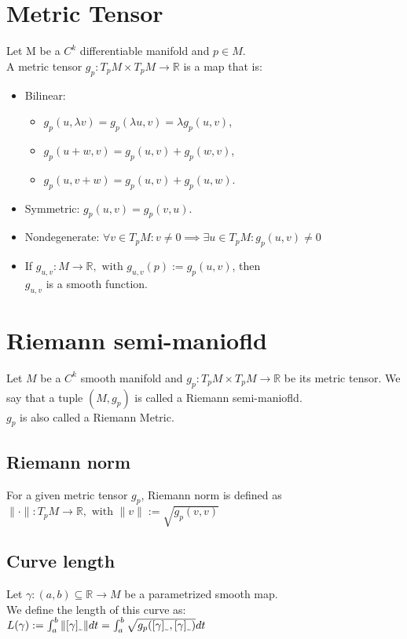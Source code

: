 \documentclass[a4paper, 11pt]{article}
\newcommand{\Real}{\mathbb{R}}
\theoremstyle{definition}
\begin{document}
\section{Metric Tensor}
Let M be a $C^k$ differentiable manifold and $p \in M$. \\
A metric tensor $g_p: T_pM \times T_pM \rightarrow \Real$ is a map that is: \\
\begin{itemize}
  \item Bilinear: 
		\begin{itemize}
			\item $g_p(u, \lambda v) = g_p(\lambda u, v) = \lambda g_p(u, v)$,
			\item $g_p(u + w, v) = g_p(u, v) + g_p(w, v)$,
			\item $g_p(u, v + w) = g_p(u, v) + g_p(u, w)$.
		\end{itemize}
  \item Symmetric: $g_p(u, v) = g_p(v, u)$.
  \item Nondegenerate:	$\forall v \in T_pM: v \neq 0 \implies \exists u \in T_pM: g_p(u, v) \neq 0$
  \item If $g_{u, v}: M \rightarrow \Real, \text{ with } g_{u, v}(p) := g_p(u, v)$, then \\
$g_{u, v}$ is a smooth function.
\end{itemize}

\section{Riemann semi-maniofld}
Let $M$ be a $C^k$ smooth manifold and $g_p: T_pM \times T_pM \rightarrow \Real$ be its metric tensor. We say that a tuple $(M, g_p)$ is called a Riemann semi-maniofld. \\
$g_p$ is also called a Riemann Metric.

\subsection{Riemann norm}
For a given metric tensor $g_p$, Riemann norm is defined as $\|\cdot\|: T_pM \rightarrow \Real, \text{ with } \|v\| := \sqrt{g_p(v, v)}$

\subsection{Curve length}
Let $\gamma: (a, b) \subseteq \Real \rightarrow M$ be a parametrized smooth map. \\
We define the length of this curve as: \\
$L(\gamma) := \int_a^b \|[\gamma]_\text{\texttildelow}\| dt = \int_a^b \sqrt{g_p([\gamma]_\text{\texttildelow}, [\gamma]_\text{\texttildelow})} dt$
\end{document}
